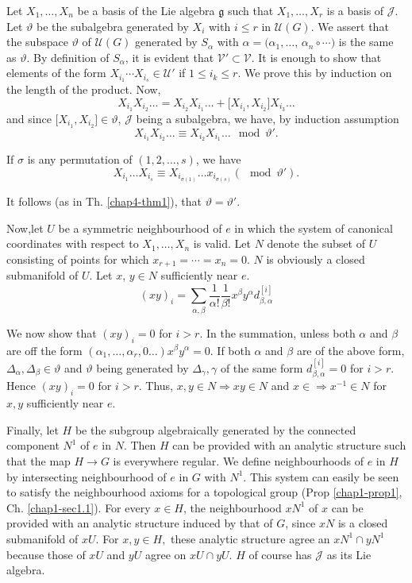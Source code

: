 Let $X_1, \ldots , X_n$  be a basis of the Lie algebra $\mathfrak{g}$
such that $X_{1} ,\ldots,   X_{r}$ is a basis of $\mathscr{J}$. Let
$\vartheta$ be the subalgebra generated by $X_i$ with $i \le r$ in
$\mathscr{U}(G)$. We assert that the subspace $\vartheta$ of
$\mathscr{U}(G)$ generated by $S_{\alpha}$ with $\alpha = (\alpha_{1}
,\ldots$, $\alpha_{n} \circ \cdots)$ is the same as $\vartheta$. By
definition of $S_{\alpha}$, it is evident that $\mathscr{V}' \subset
\mathscr{V}$.  It is enough to show that elements of the form
$X_{i_1} \cdots  X_{i_s} \in \mathscr{U}'$ if $1 \le i_{k} \le
r$. We prove this by induction on the length of the product. Now, 
$$
 X_{i_1} X_{i_2} \ldots = X_{i_2} X_{i_1} \ldots  + \big[
   X_{i_1},  X_{i_2}\big]  X_{i_3} \ldots
$$
and since $\big[X_{i_1}, X_{i_2}\big] \in \vartheta$,
 $\mathscr{J}$ being a subalgebra, we have, by induction assumption 
$$
X_{i_1} X_{i_2} \ldots \equiv X_{i_2} X_{i_1} \ldots \mod
\vartheta'. 
$$ 

If $\sigma$ is any permutation of $(1,2, \ldots, s)$, we have 
$$
X_{i_1} \ldots X_{i_s} \equiv X_{i_{\sigma(1)}} \ldots
x_{i_{\sigma(s)}} (\mod \vartheta').
$$

It follows (as in Th. \ref{chap4-thm1}), that $\vartheta = \vartheta'$.

Now,\pageoriginale let $U$ be a symmetric neighbourhood of $e$ in which
the system of 
canonical coordinates with respect to $X_1,\ldots, X_n$ is valid. Let
$N$ denote the subset of $U$ consisting of points for  which
$x_{r+1}=\cdots=x_n=0$. $N$ is obviously a closed submanifold of $U$.
Let $x$, $y \in N$ sufficiently near $e$. 
$$
(xy)_i= \sum_{\alpha,\beta}
\dfrac{1}{\alpha!}\dfrac{1}{\beta !} x^\beta y^\alpha
d^{[i]}_{\beta,\alpha} 
$$

We now show that $(xy)_i=0$ for $i > r$. In the summation, unless both
$\alpha$ and $\beta$ are off the form $(\alpha_1,\ldots,\alpha_r, 0
\ldots)x^\beta y^\alpha = 0$. If both $\alpha$ and $\beta$ are of the
above form, $\Delta_\alpha, \Delta_\beta \in \vartheta$ and
$\vartheta$ being generated by $\Delta_\gamma, \gamma$ of the same
form $d^{[i]}_{\beta,\alpha}=0$ for $i>r$. Hence $(xy)_i=0 $ for
$i>r$. Thus, $x, y \in N \Rightarrow xy \in N$ and $x \in \Rightarrow
x^{-1} \in N$ for $x,y$ sufficiently near $e$.  

Finally, let $H$ be the subgroup algebraically generated by the 
connected component $N^1$ of $e$ in $N$. Then $H$ can be provided with
an analytic structure such that the map $H \rightarrow G$ is everywhere
regular. We define neighbourhoods of $e$ in $H$ by intersecting
neighbourhood of $e$ in $G$ with $N^1$. This system can easily be seen
to satisfy the neighbourhood axioms for a topological group (Prop \ref{chap1-prop1},
Ch. \ref{chap1-sec1.1}). For every $x \in H$, the neighbourhood $x N^1$ of $x$ 
can be provided with an analytic structure induced by that of $G$,
since $x N$ is a closed submanifold of $x U$. For $x,y \in H,$ these
analytic structure agree an $x N^1\cap yN^1$ because those of $x U$
and $y U$ agree on $x U\cap y U$. $H$ of course has $\mathscr{J}$ as
its Lie algebra.  

